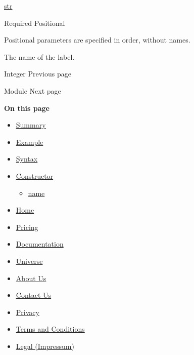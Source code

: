 \href{/docs/reference/foundations/str/}{str}

{Required} {{ Positional }}

\label{constructor-name-positional-tooltip}
Positional parameters are specified in order, without names.

The name of the label.

\href{/docs/reference/foundations/int/}{\pandocbounded{}}

{ Integer } { Previous page }

\href{/docs/reference/foundations/module/}{\pandocbounded{}}

{ Module } { Next page }

\textbf{On this page}

\begin{itemize}
\tightlist
\item
  \hyperref[summary]{Summary}
\item
  \hyperref[example]{Example}
\item
  \hyperref[syntax]{Syntax}
\item
  \hyperref[constructor]{Constructor}

  \begin{itemize}
  \tightlist
  \item
    \hyperref[constructor-name]{name}
  \end{itemize}
\end{itemize}

\begin{itemize}
\tightlist
\item
  \href{/}{Home}
\item
  \href{/pricing/}{Pricing}
\item
  \href{/docs/}{Documentation}
\item
  \href{/universe/}{Universe}
\item
  \href{/about/}{About Us}
\item
  \href{/contact/}{Contact Us}
\item
  \href{/privacy/}{Privacy}
\item
  \href{https://typst.app/terms}{Terms and Conditions}
\item
  \href{/legal/}{Legal (Impressum)}
\end{itemize}

